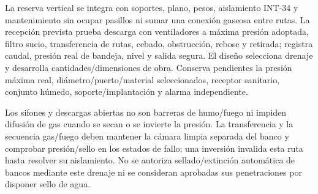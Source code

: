 La reserva vertical se integra con soportes, plano, pesos, aislamiento INT-34 y mantenimiento sin ocupar pasillos ni sumar una conexión gaseosa entre rutas. La recepción prevista prueba descarga con ventiladores a máxima presión adoptada, filtro sucio, transferencia de rutas, cebado, obstrucción, rebose y retirada; registra caudal, presión real de bandeja, nivel y salida segura. El diseño selecciona drenaje y desarrolla cantidades/dimensiones de obra. Conserva pendientes la presión máxima real, diámetro/puerto/material seleccionados, receptor sanitario, conjunto húmedo, soporte/implantación y alarma independiente.

Los sifones y descargas abiertas no son barreras de humo/fuego ni impiden difusión de gas cuando se secan o se invierte la presión. La transferencia y la secuencia gas/fuego deben mantener la cámara limpia separada del banco y comprobar presión/sello en los estados de fallo; una inversión invalida esta ruta hasta resolver su aislamiento. No se autoriza sellado/extinción automática de bancos mediante este drenaje ni se consideran aprobadas sus penetraciones por disponer sello de agua.
